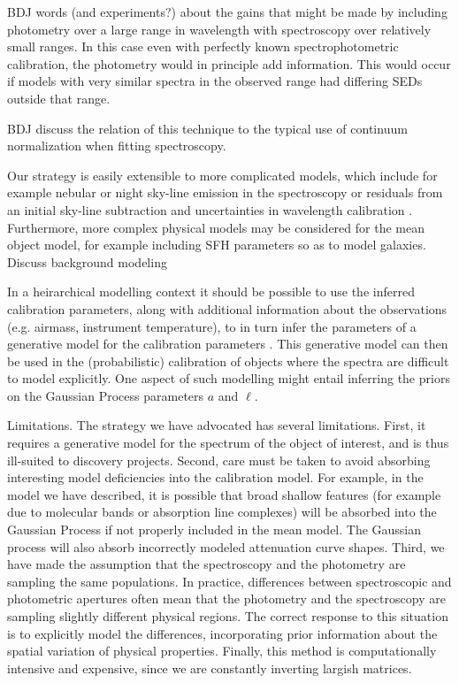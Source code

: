 \documentclass[iop,numberedappendix]{emulateapj}
\begin{document}
{\color{blue} BDJ words (and experiments?) about the gains that might
be made by including photometry over a large range in wavelength with
spectroscopy over relatively small ranges.}  In this case even with
perfectly known spectrophotometric calibration, the photometry would
in principle add information.  This would occur if models with very
similar spectra in the observed range had differing SEDs outside that
range.

{\color{blue} BDJ discuss the relation of this technique to the typical use of
continuum normalization when fitting spectroscopy.}

Our strategy is easily extensible to more complicated models, which
include for example nebular or night sky-line emission in the
spectroscopy \citep[e.g.,][]{gullikson14} or residuals from an initial
sky-line subtraction and uncertainties in wavelength calibration
\citep[e.g.,][]{walker15}. Furthermore, more complex physical models
may be considered for the mean object model, for example including SFH
parameters so as to model galaxies. {\color{blue} Discuss background
modeling}

In a heirarchical modelling context it should be possible to use the
inferred calibration parameters, along with additional information
about the observations (e.g. airmass, instrument temperature), to in
turn infer the parameters of a generative model for the calibration
parameters \citep[e.g.][]{spectrophot}. This generative model can then
be used in the (probabilistic) calibration of objects where the
spectra are difficult to model explicitly.  One aspect of such
modelling might entail inferring the priors on the Gaussian Process
parameters $a$ and $\ell$.

Limitations.  The strategy we have advocated has several limitations.
First, it requires a generative model for the spectrum of the object
of interest, and is thus ill-suited to discovery projects.  Second,
care must be taken to avoid absorbing interesting model deficiencies
into the calibration model. For example, in the model we have
described, it is possible that broad shallow features (for example due
to molecular bands or absorption line complexes) will be absorbed into
the Gaussian Process if not properly included in the mean model. The
Gaussian process will also absorb incorrectly modeled attenuation
curve shapes. Third, we have made the assumption that the spectroscopy
and the photometry are sampling the same populations.  In practice,
differences between spectroscopic and photometric apertures often mean
that the photometry and the spectroscopy are sampling slightly
different physical regions.  The correct response to this situation is
to explicitly model the differences, incorporating prior information
about the spatial variation of physical properties.  Finally, this
method is computationally intensive and expensive, since we are
constantly inverting largish matrices.
\end{document}
